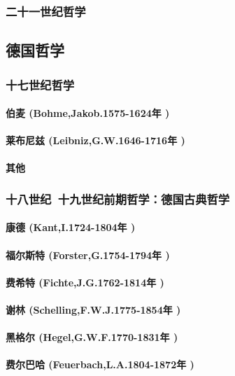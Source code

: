 \documentclass[UTF8]{../RepresentationUniverse}
\begin{document}
\subsubsection{二十一世纪哲学}


\subsection{德国哲学}
\subsubsection{十七世纪哲学}
    \paragraph{伯麦 (Bohme,Jakob.1575-1624年 )}
    \paragraph{莱布尼兹 (Leibniz,G.W.1646-1716年 )}
    \paragraph{其他}
\subsubsection{十八世纪~十九世纪前期哲学：德国古典哲学}
    \paragraph{康德 (Kant,I.1724-1804年 )}
    \paragraph{福尔斯特 (Forster,G.1754-1794年 )}
    \paragraph{费希特 (Fichte,J.G.1762-1814年 )}
    \paragraph{谢林 (Schelling,F.W.J.1775-1854年 )}
    \paragraph{黑格尔 (Hegel,G.W.F.1770-1831年 )}
    \paragraph{费尔巴哈 (Feuerbach,L.A.1804-1872年 )}
\end{document}

